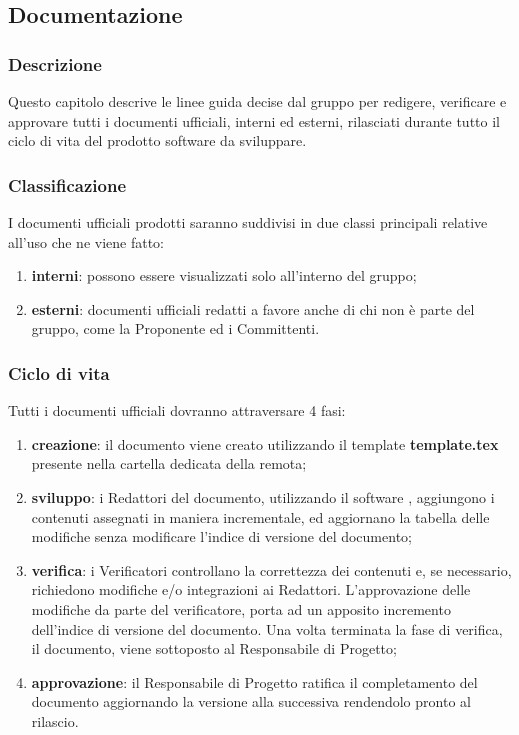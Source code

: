 \subsection{Documentazione}

	\subsubsection{Descrizione}
	Questo capitolo descrive le linee guida decise dal gruppo per redigere, verificare e approvare tutti i documenti ufficiali, interni ed esterni, rilasciati durante tutto il ciclo di vita del prodotto software da sviluppare.

	\subsubsection{Classificazione}
	I documenti ufficiali prodotti saranno suddivisi in due classi principali relative all'uso che ne viene fatto:
	\begin{enumerate}
		\item \textbf{interni}: possono essere visualizzati solo all'interno del gruppo;
		\item \textbf{esterni}: documenti ufficiali redatti a favore anche di chi non è parte del gruppo, come la Proponente ed i Committenti.
	\end{enumerate}

	\subsubsection{Ciclo di vita}
	Tutti i documenti ufficiali dovranno attraversare 4 fasi:
	\begin{enumerate}
		\item \textbf{creazione}: il documento viene creato utilizzando il template \textbf{template.tex} presente nella cartella dedicata della  remota;
		\item \textbf{sviluppo}: i Redattori del documento, utilizzando il software , aggiungono i contenuti assegnati in maniera incrementale, ed aggiornano la tabella delle modifiche senza modificare l'indice di versione del documento;
		\item \textbf{verifica}: i Verificatori controllano la correttezza dei contenuti e, se necessario, richiedono modifiche e/o integrazioni ai Redattori. L'approvazione delle modifiche da parte del verificatore, porta ad un apposito incremento dell'indice di versione del documento. Una volta terminata la fase di verifica, il documento, viene sottoposto al Responsabile di Progetto;
		\item \textbf{approvazione}: il Responsabile di Progetto ratifica il completamento del documento aggiornando la versione alla  successiva rendendolo pronto al rilascio.
	\end{enumerate}

